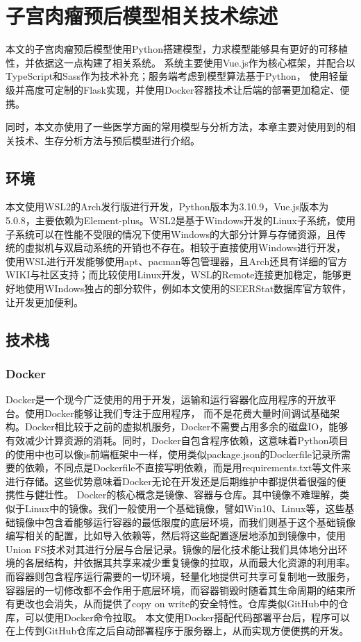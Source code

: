 \chapter{子宫肉瘤预后模型相关技术综述}
\label{chap:env} 

本文的子宫肉瘤预后模型使用Python搭建模型，力求模型能够具有更好的可移植性，并依据这一点构建了相关系统。
系统主要使用Vue.js作为核心框架，并配合以TypeScript和Sass作为技术补充；服务端考虑到模型算法基于Python，
使用轻量级并高度可定制的Flask实现，并使用Docker容器技术让后端的部署更加稳定、便携。

同时，本文亦使用了一些医学方面的常用模型与分析方法，本章主要对使用到的相关技术、生存分析方法与预后模型进行介绍。

\section{环境}

本文使用WSL2的Arch发行版进行开发，Python版本为3.10.9，Vue.js版本为5.0.8，主要依赖为Element-plus。WSL2是基于Windows开发的Linux子系统，使用子系统可以在性能不受限的情况下使用Windows的大部分计算与存储资源，且传统的虚拟机与双启动系统的开销也不存在。相较于直接使用Windows进行开发，使用WSL进行开发能够使用apt、pacman等包管理器，且Arch还具有详细的官方WIKI与社区支持；而比较使用Linux开发，WSL的Remote连接更加稳定，能够更好地使用WIndows独占的部分软件，例如本文使用的SEERStat数据库官方软件，让开发更加便利。

\section{技术栈}

\subsection{Docker}

Docker是一个现今广泛使用的用于开发，运输和运行容器化应用程序的开放平台。使用Docker能够让我们专注于应用程序，
而不是花费大量时间调试基础架构。Docker相比较于之前的虚拟机服务，Docker不需要占用多余的磁盘IO，能够有效减少计算资源的消耗。同时，Docker自包含程序依赖，这意味着Python项目的使用中也可以像js前端框架中一样，使用类似package.json的Dockerfile记录所需要的依赖，不同点是Dockerfile不直接写明依赖，而是用requirements.txt等文件来进行存储。这些优势意味着Docker无论在开发还是后期维护中都提供着很强的便携性与健壮性。
Docker的核心概念是镜像、容器与仓库。其中镜像不难理解，类似于Linux中的镜像。我们一般使用一个基础镜像，譬如Win10、Linux等，这些基础镜像中包含着能够运行容器的最低限度的底层环境，而我们则基于这个基础镜像编写相关的配置，比如导入依赖等，然后将这些配置逐层地添加到镜像中，使用Union FS技术对其进行分层与合层记录。镜像的层化技术能让我们具体地分出环境的各层结构，并依据其共享来减少重复镜像的拉取，从而最大化资源的利用率。而容器则包含程序运行需要的一切环境，轻量化地提供可共享可复制地一致服务，容器层的一切修改都不会作用于底层环境，而容器销毁时随着其生命周期的结束所有更改也会消失，从而提供了copy on write的安全特性。仓库类似GitHub中的仓库，可以使用Docker命令拉取。
本文使用Docker搭配代码部署平台后，程序可以在上传到GitHub仓库之后自动部署程序于服务器上，从而实现方便便携的开发。


